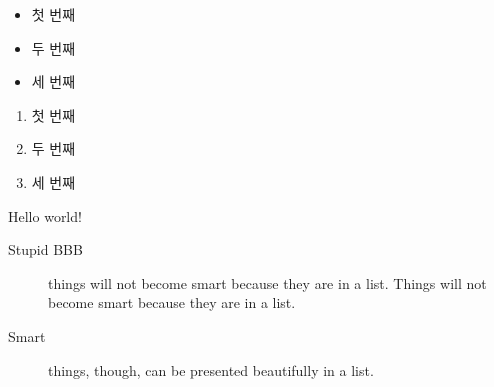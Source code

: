\documentclass[chapter, footnote, a4paper, 10pt]{oblivoir}
\begin{document}
\begin{itemize}
\item 첫 번째
\item 두 번째
\item 세 번째
\end{itemize}

\begin{enumerate}
\item 첫 번째
\item 두 번째
\item 세 번째
\end{enumerate}

\noindent
Hello world!

\begin{description}
\item[Stupid BBB] things will not become smart because they are in a list. Things will not become smart because they are in a list.
\item[Smart] things, though, can be presented beautifully in a list.
\end{description}

\tableofcontents*






\printindex
\end{document}
